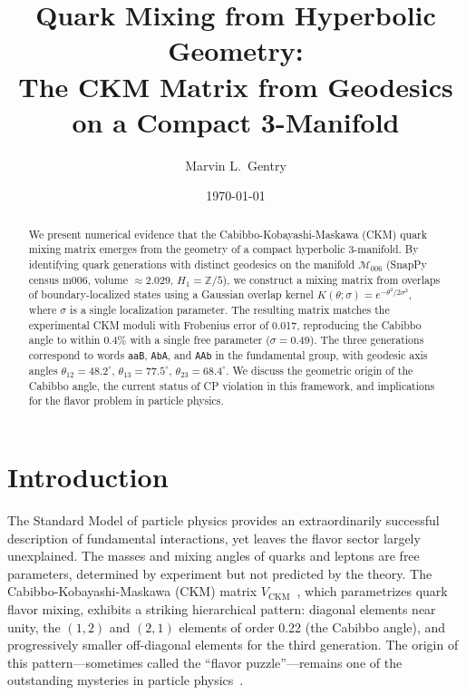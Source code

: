 \documentclass[12pt,prd,superscriptaddress,nofootinbib]{revtex4-2}
\newcommand{\CKM}{V_{\mathrm{CKM}}}
\newcommand{\Msix}{\mathcal{M}_{006}}
\begin{document}
\title{Quark Mixing from Hyperbolic Geometry:\\
The CKM Matrix from Geodesics on a Compact 3-Manifold}

\author{Marvin L.\ Gentry}

\date{\today}

\begin{abstract}
We present numerical evidence that the Cabibbo-Kobayashi-Maskawa (CKM)
quark mixing matrix emerges from the geometry of a compact hyperbolic
3-manifold. By identifying quark generations with distinct geodesics
on the manifold $\Msix$ (SnapPy census m006, volume $\approx 2.029$,
$H_1 = \mathbb{Z}/5$), we construct a mixing matrix from overlaps of
boundary-localized states using a Gaussian overlap kernel
$K(\theta;\sigma) = e^{-\theta^2/2\sigma^2}$, where $\sigma$
is a single localization parameter. The resulting matrix matches the experimental
CKM moduli with Frobenius error of 0.017, reproducing the Cabibbo angle
to within 0.4\% with a single free parameter ($\sigma = 0.49$). The three
generations correspond to words \texttt{aaB}, \texttt{AbA}, and
\texttt{AAb} in the fundamental group, with geodesic axis angles
$\theta_{12} = 48.2^\circ$, $\theta_{13} = 77.5^\circ$,
$\theta_{23} = 68.4^\circ$. We discuss the geometric origin of the
Cabibbo angle, the current status of CP violation in this framework,
and implications for the flavor problem in particle physics.
\end{abstract}

\maketitle

\section{Introduction}
\label{sec:intro}

The Standard Model of particle physics provides an extraordinarily 
successful description of fundamental interactions, yet leaves the 
flavor sector largely unexplained. The masses and mixing angles of 
quarks and leptons are free parameters, determined by experiment but 
not predicted by the theory. The Cabibbo-Kobayashi-Maskawa (CKM) matrix 
$\CKM$~\cite{Cabibbo1963,KobayashiMaskawa1973}, which parametrizes 
quark flavor mixing, exhibits a striking hierarchical pattern: diagonal 
elements near unity, the $(1,2)$ and $(2,1)$ elements of order 0.22 
(the Cabibbo angle), and progressively smaller off-diagonal elements 
for the third generation. The origin of this pattern---sometimes called 
the ``flavor puzzle''---remains one of the outstanding mysteries in 
particle physics~\cite{Feruglio2015}.
\end{document}
